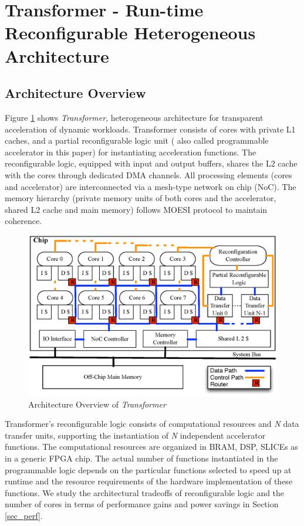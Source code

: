 \section{Transformer - Run-time Reconfigurable Heterogeneous Architecture}
\label{sec_arch}


\subsection{Architecture Overview}

Figure \ref{fig_arch} shows {\em Transformer}, heterogeneous
architecture for transparent acceleration of dynamic
workloads. Transformer consists of cores with private L1 caches, and a
partial reconfigurable logic unit ( also called programmable
accelerator in this paper) for instantiating acceleration
functions. The reconfigurable logic, equipped with input and output
buffers, shares the L2 cache with the cores through dedicated DMA
channels. All processing elements (cores and accelerator) are
interconnected via a mesh-type network on chip (NoC). The memory
hierarchy (private memory units of both cores and the accelerator,
shared L2 cache and main memory) follows MOESI protocol to maintain
coherence.

\begin{figure}
    \centering
    \includegraphics[width=4.0 in]{HPCA14-arch}
    \caption{Architecture Overview of {\em Transformer} }
    \label{fig_arch}
\vspace{-0.05in}
\end{figure}

Transformer's reconfigurable logic consists of computational resources
and {\em N} data transfer
units, supporting the instantiation of {\em N} independent accelerator
functions. The computational resources are organized in BRAM, DSP,
SLICEs as in a generic FPGA chip. The actual number of functions instantiated in the
programmable logic depends on the particular functions selected to
speed up at runtime and the resource requirements of the hardware
implementation of these functions. We study the architectural tradeoffs of 
reconfigurable logic and the number of cores in terms of performance
gains and power savings in Section \ref{sec_perf}.

